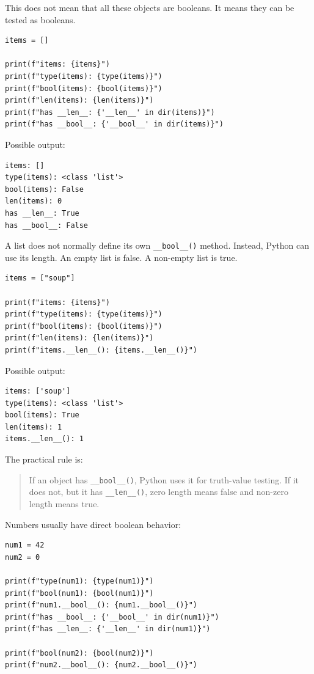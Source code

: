 \documentclass[a4paper,twoside]{report}
\begin{document}
This does not mean that all these objects are booleans. It means they can be tested as booleans.

\begin{verbatim}
items = []

print(f"items: {items}")
print(f"type(items): {type(items)}")
print(f"bool(items): {bool(items)}")
print(f"len(items): {len(items)}")
print(f"has __len__: {'__len__' in dir(items)}")
print(f"has __bool__: {'__bool__' in dir(items)}")
\end{verbatim}

Possible output:

\begin{verbatim}
items: []
type(items): <class 'list'>
bool(items): False
len(items): 0
has __len__: True
has __bool__: False
\end{verbatim}

A list does not normally define its own \texttt{\_\_bool\_\_()} method. Instead, Python can use its length. An empty list is false. A non-empty list is true.

\begin{verbatim}
items = ["soup"]

print(f"items: {items}")
print(f"type(items): {type(items)}")
print(f"bool(items): {bool(items)}")
print(f"len(items): {len(items)}")
print(f"items.__len__(): {items.__len__()}")
\end{verbatim}

Possible output:

\begin{verbatim}
items: ['soup']
type(items): <class 'list'>
bool(items): True
len(items): 1
items.__len__(): 1
\end{verbatim}

The practical rule is:

\begin{quote}
If an object has \texttt{\_\_bool\_\_()}, Python uses it for truth-value testing. If it does not, but it has \texttt{\_\_len\_\_()}, zero length means false and non-zero length means true.
\end{quote}

Numbers usually have direct boolean behavior:

\begin{verbatim}
num1 = 42
num2 = 0

print(f"type(num1): {type(num1)}")
print(f"bool(num1): {bool(num1)}")
print(f"num1.__bool__(): {num1.__bool__()}")
print(f"has __bool__: {'__bool__' in dir(num1)}")
print(f"has __len__: {'__len__' in dir(num1)}")

print(f"bool(num2): {bool(num2)}")
print(f"num2.__bool__(): {num2.__bool__()}")
\end{verbatim}
\end{document}
